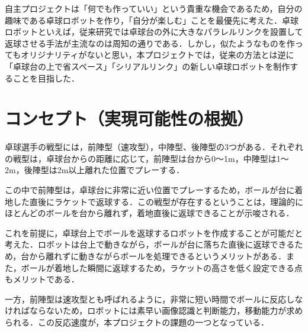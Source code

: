\documentclass[10pt, oneside, titlepage]{ltjarticle}  %
\begin{document}
自主プロジェクトは「何でも作っていい」という貴重な機会であるため，自分の趣味である卓球ロボットを作り，「自分が楽しむ」ことを最優先に考えた．卓球ロボットといえば，従来研究では卓球台の外に大きなパラレルリンクを設置して返球させる手法が主流なのは周知の通りである\cite{omron}．しかし，似たようなものを作ってもオリジナリティがないと思い，本プロジェクトでは，従来の方法とは逆に「卓球台の上で省スペース」「シリアルリンク」の新しい卓球ロボットを制作することを目指した．

\section{コンセプト（実現可能性の根拠）}
卓球選手の戦型には，前陣型（速攻型），中陣型、後陣型の3つがある．それぞれの戦型は，卓球台からの距離に応じて，前陣型は台から0〜1m，中陣型は1〜2m，後陣型は2m以上離れた位置でプレーする．

この中で前陣型は，卓球台に非常に近い位置でプレーするため，ボールが台に着地した直後にラケットで返球する．この戦型が存在するということは，理論的にほとんどのボールを台から離れず，着地直後に返球できることが示唆される．

これを前提に，卓球台上でボールを返球するロボットを作成することが可能だと考えた．ロボットは台上で動きながら，ボールが台に落ちた直後に返球できるため，台から離れずに動きながらボールを処理できるというメリットがある．また，ボールが着地した瞬間に返球するため，ラケットの高さを低く設定できる点もメリットである．

一方，前陣型は速攻型とも呼ばれるように，非常に短い時間でボールに反応しなければならないため，ロボットには素早い画像認識と判断能力，移動能力が求められる．この反応速度が，本プロジェクトの課題の一つとなっている．
\end{document}
